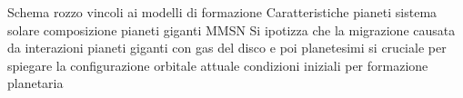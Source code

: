 
\begin{wordonframe}{Schema rozzo vincoli ai modelli di formazione}
Caratteristiche pianeti sistema solare
composizione pianeti giganti
MMSN
Si ipotizza che la migrazione causata da interazioni pianeti giganti con gas del disco e poi planetesimi si cruciale per spiegare la configurazione orbitale attuale
condizioni iniziali per formazione planetaria
\end{wordonframe}

